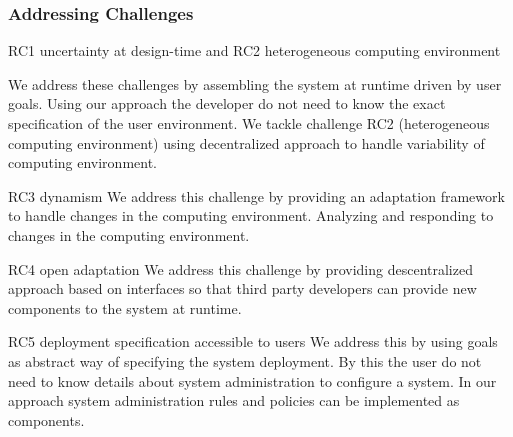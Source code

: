 \subsubsection{Addressing Challenges}
RC1 uncertainty at design-time and RC2 heterogeneous computing environment

We address these challenges by assembling the system at runtime driven by user goals. Using our approach the developer do not need to know the exact specification of the user environment.
We tackle challenge RC2 (heterogeneous computing environment) using decentralized approach to handle variability of computing environment.

RC3 dynamism
We address this challenge by providing an adaptation framework to handle changes in the computing environment.
Analyzing and responding to changes in the computing environment.

RC4 open adaptation
We address this challenge by providing descentralized approach based on interfaces so that third party developers can provide new components to the system at runtime.


RC5 deployment specification accessible to users
We address this by using goals as abstract way of specifying the system deployment. By this the user do not need to know details about system administration to configure a system. In our approach system administration rules and policies can be implemented as components.
